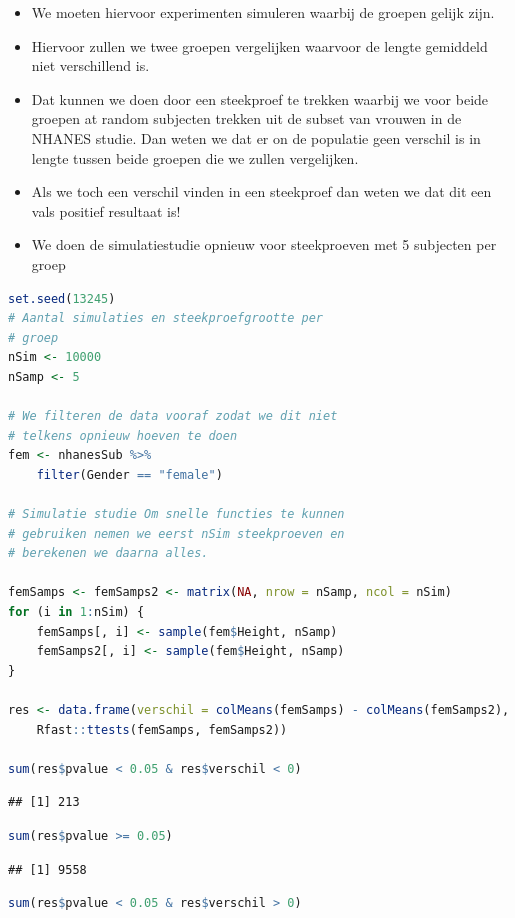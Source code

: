 \documentclass[
  12pt,dutch,coursenotes]{book}
\theoremstyle{definition}
\theoremstyle{definition}
\theoremstyle{definition}
\theoremstyle{definition}
\theoremstyle{remark}
\begin{document}
\begin{itemize}
\item
  We moeten hiervoor experimenten simuleren waarbij de groepen gelijk zijn.
\item
  Hiervoor zullen we twee groepen vergelijken waarvoor de lengte gemiddeld niet verschillend is.
\item
  Dat kunnen we doen door een steekproef te trekken waarbij we voor beide groepen at random subjecten trekken uit de subset van vrouwen in de NHANES studie. Dan weten we dat er on de populatie geen verschil is in lengte tussen beide groepen die we zullen vergelijken.
\item
  Als we toch een verschil vinden in een steekproef dan weten we dat dit een vals positief resultaat is!
\item
  We doen de simulatiestudie opnieuw voor steekproeven met 5 subjecten per groep
\end{itemize}

\begin{lstlisting}[language=R]
set.seed(13245)
# Aantal simulaties en steekproefgrootte per
# groep
nSim <- 10000
nSamp <- 5

# We filteren de data vooraf zodat we dit niet
# telkens opnieuw hoeven te doen
fem <- nhanesSub %>%
    filter(Gender == "female")

# Simulatie studie Om snelle functies te kunnen
# gebruiken nemen we eerst nSim steekproeven en
# berekenen we daarna alles.

femSamps <- femSamps2 <- matrix(NA, nrow = nSamp, ncol = nSim)
for (i in 1:nSim) {
    femSamps[, i] <- sample(fem$Height, nSamp)
    femSamps2[, i] <- sample(fem$Height, nSamp)
}

res <- data.frame(verschil = colMeans(femSamps) - colMeans(femSamps2),
    Rfast::ttests(femSamps, femSamps2))

sum(res$pvalue < 0.05 & res$verschil < 0)
\end{lstlisting}

\begin{lstlisting}
## [1] 213
\end{lstlisting}

\begin{lstlisting}[language=R]
sum(res$pvalue >= 0.05)
\end{lstlisting}

\begin{lstlisting}
## [1] 9558
\end{lstlisting}

\begin{lstlisting}[language=R]
sum(res$pvalue < 0.05 & res$verschil > 0)
\end{lstlisting}
\end{document}
